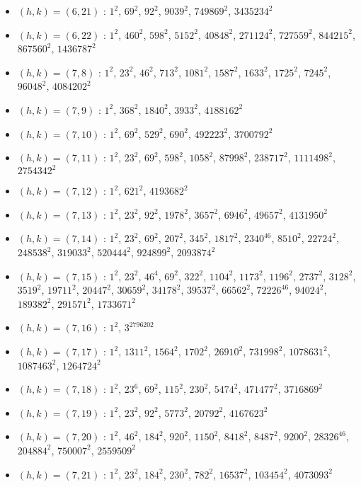 \begin{itemize}
\item $(h,k)=(6,21)$ : $1^{2}$, $69^{2}$, $92^{2}$, $9039^{2}$, $749869^{2}$, $3435234^{2}$
\item $(h,k)=(6,22)$ : $1^{2}$, $460^{2}$, $598^{2}$, $5152^{2}$, $40848^{2}$, $271124^{2}$, $727559^{2}$, $844215^{2}$, $867560^{2}$, $1436787^{2}$
\item $(h,k)=(7,8)$ : $1^{2}$, $23^{2}$, $46^{2}$, $713^{2}$, $1081^{2}$, $1587^{2}$, $1633^{2}$, $1725^{2}$, $7245^{2}$, $96048^{2}$, $4084202^{2}$
\item $(h,k)=(7,9)$ : $1^{2}$, $368^{2}$, $1840^{2}$, $3933^{2}$, $4188162^{2}$
\item $(h,k)=(7,10)$ : $1^{2}$, $69^{2}$, $529^{2}$, $690^{2}$, $492223^{2}$, $3700792^{2}$
\item $(h,k)=(7,11)$ : $1^{2}$, $23^{2}$, $69^{2}$, $598^{2}$, $1058^{2}$, $87998^{2}$, $238717^{2}$, $1111498^{2}$, $2754342^{2}$
\item $(h,k)=(7,12)$ : $1^{2}$, $621^{2}$, $4193682^{2}$
\item $(h,k)=(7,13)$ : $1^{2}$, $23^{2}$, $92^{2}$, $1978^{2}$, $3657^{2}$, $6946^{2}$, $49657^{2}$, $4131950^{2}$
\item $(h,k)=(7,14)$ : $1^{2}$, $23^{2}$, $69^{2}$, $207^{2}$, $345^{2}$, $1817^{2}$, $2340^{46}$, $8510^{2}$, $22724^{2}$, $248538^{2}$, $319033^{2}$, $520444^{2}$, $924899^{2}$, $2093874^{2}$
\item $(h,k)=(7,15)$ : $1^{2}$, $23^{2}$, $46^{4}$, $69^{2}$, $322^{2}$, $1104^{2}$, $1173^{2}$, $1196^{2}$, $2737^{2}$, $3128^{2}$, $3519^{2}$, $19711^{2}$, $20447^{2}$, $30659^{2}$, $34178^{2}$, $39537^{2}$, $66562^{2}$, $72226^{46}$, $94024^{2}$, $189382^{2}$, $291571^{2}$, $1733671^{2}$
\item $(h,k)=(7,16)$ : $1^{2}$, $3^{2796202}$
\item $(h,k)=(7,17)$ : $1^{2}$, $1311^{2}$, $1564^{2}$, $1702^{2}$, $26910^{2}$, $731998^{2}$, $1078631^{2}$, $1087463^{2}$, $1264724^{2}$
\item $(h,k)=(7,18)$ : $1^{2}$, $23^{6}$, $69^{2}$, $115^{2}$, $230^{2}$, $5474^{2}$, $471477^{2}$, $3716869^{2}$
\item $(h,k)=(7,19)$ : $1^{2}$, $23^{2}$, $92^{2}$, $5773^{2}$, $20792^{2}$, $4167623^{2}$
\item $(h,k)=(7,20)$ : $1^{2}$, $46^{2}$, $184^{2}$, $920^{2}$, $1150^{2}$, $8418^{2}$, $8487^{2}$, $9200^{2}$, $28326^{46}$, $204884^{2}$, $750007^{2}$, $2559509^{2}$
\item $(h,k)=(7,21)$ : $1^{2}$, $23^{2}$, $184^{2}$, $230^{2}$, $782^{2}$, $16537^{2}$, $103454^{2}$, $4073093^{2}$

\end{itemize}
